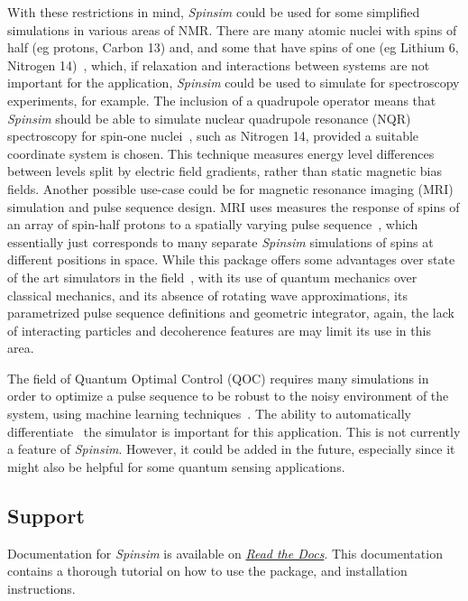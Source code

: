 \documentclass{jors}
\begin{document}
		With these restrictions in mind, \emph{Spinsim} could be used for some simplified simulations in various areas of NMR.
		There are many atomic nuclei with spins of half (eg protons, Carbon 13) and, and some that have spins of one (eg Lithium 6, Nitrogen 14)~\cite{fuller_nuclear_1976}, which, if relaxation and interactions between systems are not important for the application, \emph{Spinsim} could be used to simulate for spectroscopy experiments, for example.
		The inclusion of a quadrupole operator means that \emph{Spinsim} should be able to simulate nuclear quadrupole resonance (NQR) spectroscopy for spin-one nuclei~\cite{bain_nqr_2004}, such as Nitrogen 14, provided a suitable coordinate system is chosen.
		This technique measures energy level differences between levels split by electric field gradients, rather than static magnetic bias fields.
		Another possible use-case could be for magnetic resonance imaging (MRI) simulation and pulse sequence design.
		MRI uses measures the response of spins of an array of spin-half protons to a spatially varying pulse sequence~\cite{mckinnon_physics_1998}, which essentially just corresponds to many separate \emph{Spinsim} simulations of spins at different positions in space.
		While this package offers some advantages over state of the art simulators in the field~\cite{kose_fast_2019}, with its use of quantum mechanics over classical mechanics, and its absence of rotating wave approximations, its parametrized pulse sequence definitions and geometric integrator, again, the lack of interacting particles and decoherence features are may limit its use in this area.

		The field of Quantum Optimal Control (QOC) requires many simulations in order to optimize a pulse sequence to be robust to the noisy environment of the system, using machine learning techniques~\cite{dalgaard_fast_2021}.
		The ability to automatically differentiate~\cite{griewank_who_2012} the simulator is important for this application.
		This is not currently a feature of \emph{Spinsim}.
		However, it could be added in the future, especially since it might also be helpful for some quantum sensing applications.

	\subsection{Support}
		Documentation for \emph{Spinsim} is available on \href{https://spinsim.readthedocs.io/en/latest/}{\emph{Read the Docs}}.
		This documentation contains a thorough tutorial on how to use the package, and installation instructions.
		
\end{document}
